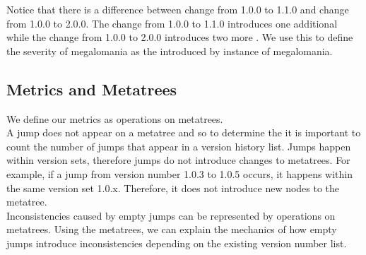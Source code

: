 \documentclass[conference]{IEEEtran}
\begin{document}
Notice that there is a difference between change from 1.0.0 to 1.1.0 and change from 1.0.0 to 2.0.0. 
The change from 1.0.0 to 1.1.0 introduces one additional \choice while the change from 1.0.0 to 2.0.0 introduces two more \choices.
We use this to define the severity of megalomania as the \numberextrachoices introduced by instance of megalomania.

\subsection{Metrics and Metatrees}

We define our metrics as operations on metatrees. \\


A jump does not appear on a metatree and so to determine the \numberchoices it is important to count the number of jumps that appear in a version history list.  
Jumps happen within version sets, therefore jumps do not introduce changes to metatrees. For example, if a jump from version number 1.0.3 to 1.0.5 occurs, it happens within the same version set 1.0.x. Therefore, it does not introduce new nodes to the metatree.
\\

Inconsistencies caused by empty jumps can be represented by operations on metatrees.
Using the metatrees, we can explain the mechanics of how empty jumps introduce inconsistencies depending on the existing version number list.
\end{document}
